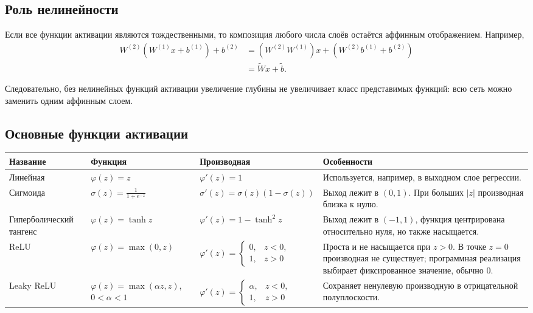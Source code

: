 \documentclass[12pt,a4paper]{article}
\theoremstyle{plain}
\theoremstyle{definition}
\theoremstyle{remark}
\newcommand{\abs}[1]{\left| #1 \right|}
\begin{document}
\subsection{Роль нелинейности}

Если все функции активации являются тождественными, то композиция
любого числа слоёв остаётся аффинным отображением. Например,
\[
\begin{aligned}
    W^{(2)}
    \left(
        W^{(1)}x+b^{(1)}
    \right)
    +b^{(2)}
    &=
    \left(
        W^{(2)}W^{(1)}
    \right)x
    +
    \left(
        W^{(2)}b^{(1)}+b^{(2)}
    \right)\\
    &=\widetilde{W}x+\widetilde{b}.
\end{aligned}
\]

Следовательно, без нелинейных функций активации увеличение глубины
не увеличивает класс представимых функций: всю сеть можно заменить
одним аффинным слоем.

\subsection{Основные функции активации}

\begin{center}
\begin{tabularx}{\textwidth}{
    >{\raggedright\arraybackslash}p{}
    >{\centering\arraybackslash}p{}
    >{\centering\arraybackslash}p{}
    X
}
\toprule
\textbf{Название} &
\textbf{Функция} &
\textbf{Производная} &
\textbf{Особенности}\\
\midrule

Линейная &
$\varphi(z)=z$ &
$\varphi'(z)=1$ &
Используется, например, в выходном слое регрессии.\\[1ex]

Сигмоида &
$\displaystyle
\sigma(z)=\frac{1}{1+e^{-z}}
$ &
$\sigma'(z)=\sigma(z)(1-\sigma(z))$ &
Выход лежит в $(0,1)$. При больших $\abs{z}$ производная близка
к нулю.\\[2ex]

Гиперболический тангенс &
$\varphi(z)=\tanh z$ &
$\varphi'(z)=1-\tanh^2z$ &
Выход лежит в $(-1,1)$, функция центрирована относительно нуля,
но также насыщается.\\[1ex]

ReLU &
$\varphi(z)=\max(0,z)$ &
$\varphi'(z)=
\begin{cases}
0,&z<0,\\
1,&z>0
\end{cases}$ &
Проста и не насыщается при $z>0$. В точке $z=0$ производная не
существует; программная реализация выбирает фиксированное значение,
обычно $0$.\\[3ex]

Leaky ReLU &
$\varphi(z)=\max(\alpha z,z)$,
$0<\alpha<1$ &
$\varphi'(z)=
\begin{cases}
\alpha,&z<0,\\
1,&z>0
\end{cases}$ &
Сохраняет ненулевую производную в отрицательной полуплоскости.\\
\bottomrule
\end{tabularx}
\end{center}
\end{document}

